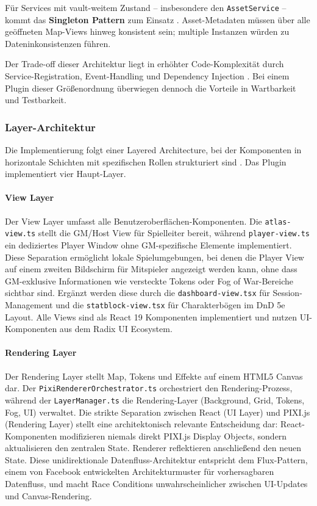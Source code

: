 Für Services mit vault-weitem Zustand -- insbesondere den \texttt{AssetService} -- kommt das \textbf{Singleton Pattern} zum Einsatz \autocite{RefactoringGuruSingleton}. Asset-Metadaten müssen über alle geöffneten Map-Views hinweg konsistent sein; multiple Instanzen würden zu Dateninkonsistenzen führen.

Der Trade-off dieser Architektur liegt in erhöhter Code-Komplexität durch Service-Registration, Event-Handling und Dependency Injection \autocite{Fowler2014}. Bei einem Plugin dieser Größenordnung überwiegen dennoch die Vorteile in Wartbarkeit und Testbarkeit.

\subsubsection{Layer-Architektur}

Die Implementierung folgt einer Layered Architecture, bei der Komponenten in horizontale Schichten mit spezifischen Rollen strukturiert sind \autocite[S.~15]{Richards2024MicrokernelArchitecture}. Das Plugin implementiert vier Haupt-Layer.

\paragraph{View Layer}

Der View Layer umfasst alle Benutzeroberflächen-Komponenten. Die \texttt{atlas-view.ts} stellt die \ac{GM}/Host View für Spielleiter bereit, während \texttt{player-view.ts} ein dediziertes Player Window ohne \ac{GM}-spezifische Elemente implementiert. Diese Separation ermöglicht lokale Spielumgebungen, bei denen die Player View auf einem zweiten Bildschirm für Mitspieler angezeigt werden kann, ohne dass \ac{GM}-exklusive Informationen wie versteckte Tokens oder Fog of War-Bereiche sichtbar sind. Ergänzt werden diese durch die \texttt{dashboard-view.tsx} für Session-Management und die \texttt{statblock-view.tsx} für Charakterbögen im \ac{DnD} 5e Layout. Alle Views sind als React 19 Komponenten implementiert und nutzen \ac{UI}-Komponenten aus dem Radix \ac{UI} Ecosystem.

\paragraph{Rendering Layer}

Der Rendering Layer stellt Map, Tokens und Effekte auf einem HTML5 Canvas dar. Der \texttt{PixiRendererOrchestrator.ts} orchestriert den Rendering-Prozess, während der \texttt{LayerManager.ts} die Rendering-Layer (Background, Grid, Tokens, Fog, \ac{UI}) verwaltet.
Die strikte Separation zwischen React (\ac{UI} Layer) und PIXI.js (Rendering Layer) stellt eine architektonisch relevante Entscheidung dar: React-Komponenten modifizieren niemals direkt PIXI.js Display Objects, sondern aktualisieren den zentralen State. Renderer reflektieren anschließend den neuen State. Diese unidirektionale Datenfluss-Architektur entspricht dem Flux-Pattern, einem von Facebook entwickelten Architekturmuster für vorhersagbaren Datenfluss, und macht Race Conditions unwahrscheinlicher zwischen \ac{UI}-Updates und Canvas-Rendering.

